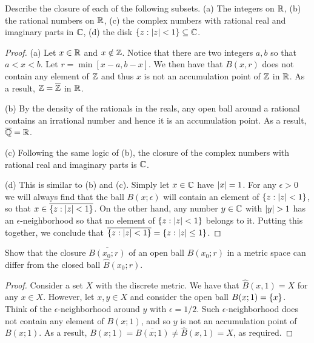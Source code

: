 \begin{exercise}{7}
Describe the closure of each of the following subsets. (a) The integers on $\mathbb{R}$, (b) the rational numbers on $\mathbb{R}$, (c) the complex numbers with rational real and imaginary parts in $\mathbb{C}$, (d) the disk $\{z: \left\lvert z\right\rvert<1\}\subseteq\mathbb{C}$.
\end{exercise}
\begin{proof}
(a) Let $x\in\mathbb{R}$ and $x\notin\mathbb{Z}$. Notice that there are two integers $a,b$ so that $a<x<b$. Let $r=\min[x-a, b-x]$. We then have that $B(x,r)$ does not contain any element of $\mathbb{Z}$ and thus $x$ is not an accumulation point of $\mathbb{Z}$ in $\mathbb{R}$. As a result, $\mathbb{Z}=\overline{\mathbb{Z}}$ in $\mathbb{R}$.

(b) By the density of the rationals in the reals, any open ball around a rational contains an irrational number and hence it is an accumulation point. As a result, $\overline{\mathbb{Q}}=\mathbb{R}$.

(c) Following the same logic of (b), the closure of the complex numbers with rational real and imaginary parts is $\mathbb{C}$.

(d) This is similar to (b) and (c). Simply let $x\in\mathbb{C}$ have $\left\lvert x\right\rvert=1$. For any $\epsilon>0$ we will always find that the ball $B(x;\epsilon)$ will contain an element of $\{z: \left\lvert z\right\rvert<1\}$, so that $x\in\overline{\{z: \left\lvert z\right\rvert<1\}}$. On the other hand, any number $y\in\mathbb{C}$ with $\left\lvert y\right\rvert>1$ has an $\epsilon$-neighborhood so that no element of $\{z: \left\lvert z\right\rvert<1\}$ belongs to it. Putting this together, we conclude that $\overline{\{z: \left\lvert z\right\rvert<1\}}=\{z: \left\lvert z\right\rvert\leq 1\}$.
\end{proof}

\begin{exercise}{8}
Show that the closure $\overline{B(x_0;r)}$ of an open ball $B(x_0;r)$ in a metric space can differ from the closed ball $\hat{B}(x_0;r)$.
\end{exercise}
\begin{proof}
Consider a set $X$ with the discrete metric. We have that $\hat{B}(x,1)=X$ for any $x\in X$. However, let $x,y\in X$ and consider the open ball $B(x;1)=\{x\}$. Think of the $\epsilon$-neighborhood around $y$ with $\epsilon=1/2$. Such $\epsilon$-neighborhood does not contain any element of $B(x;1)$, and so $y$ is not an accumulation point of $B(x;1)$. As a result, $B(x;1)=\overline{B(x;1)}\neq\hat{B}(x,1)=X$, as required.
\end{proof}

